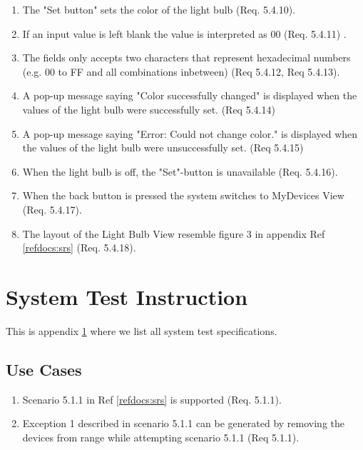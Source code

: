 \documentclass[a4paper]{article}
\newlength{\testlabellength}
\newenvironment{testlist}{\begin{enumerate}[label=\bfseries Instruction \thesubsection.\arabic* , labelindent=0pt, labelwidth=\testlabellength , leftmargin=2cm]}{\end{enumerate}}
\begin{document}
\begin{appendices}
\begin{testlist}
	\item The "Set button" sets the color of the light bulb (Req. 5.4.10).

	\item If an input value is left blank the value is interpreted as 00 (Req. 5.4.11) .   
    
    \item The fields only accepts two characters that represent hexadecimal numbers (e.g. 00 to FF and all combinations inbetween) (Req 5.4.12, Req 5.4.13).
    
    \item A pop-up message saying "Color successfully changed" is displayed when the values of the light bulb were successfully set. (Req 5.4.14)
    
    \item A pop-up message saying "Error: Could not change color." is displayed when the values of the light bulb were unsuccessfully set. (Req 5.4.15)
       
    \item When the light bulb is off, the "Set"-button is unavailable (Req. 5.4.16).
    
    \item When the back button is pressed the system switches to MyDevices View (Req. 5.4.17).
    
    \item The layout of the Light Bulb View resemble figure 3 in appendix  Ref \ref{refdocs:srs} (Req. 5.4.18).

\end{testlist}	

\newpage

\section{System Test Instruction} \label{appendix:section:systemtest}
This is appendix \ref{appendix:section:systemtest} where we list all system test specifications.

\subsection{Use Cases}
\begin{testlist}
	\item Scenario 5.1.1 in Ref \ref{refdocs:srs} is supported (Req. 5.1.1).

	\item Exception 1 described in scenario 5.1.1 can be generated by removing the devices from range while attempting scenario 5.1.1 (Req 5.1.1).
	

\end{testlist}
\end{appendices}
\end{document}
